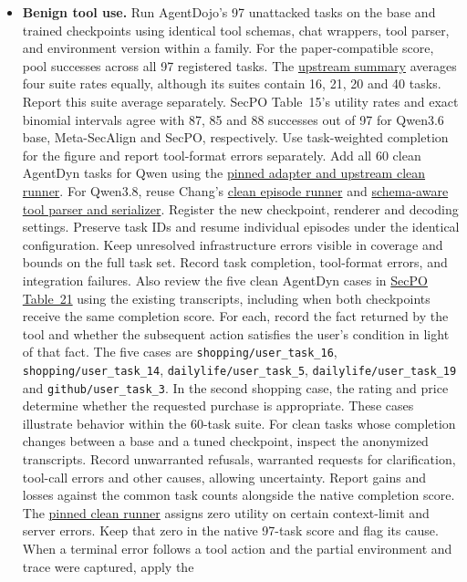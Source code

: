 \documentclass[11pt]{article}
\begin{document}
\begin{itemize}
\item \textbf{Benign tool use.} Run AgentDojo's 97 unattacked tasks on the base and trained checkpoints using identical tool schemas, chat wrappers, tool parser, and environment version within a family. For the paper-compatible score, pool successes across all 97 registered tasks. The \href{https://github.com/Sizhe-Chen/SecPO/blob/da0372a0e598badf4e51c98c175a962147cac2ac/src/secpo/evaluation/agentdojo_qwen36.py#L1174-L1185}{upstream summary} averages four suite rates equally, although its suites contain 16, 21, 20 and 40 tasks. Report this suite average separately. SecPO Table~15's utility rates and exact binomial intervals agree with 87, 85 and 88 successes out of 97 for Qwen3.6 base, Meta-SecAlign and SecPO, respectively. Use task-weighted completion for the figure and report tool-format errors separately. Add all 60 clean AgentDyn tasks for Qwen using the \href{https://github.com/Sizhe-Chen/SecPO/blob/da0372a0e598badf4e51c98c175a962147cac2ac/docs/AGENTDYN.md}{pinned adapter and upstream clean runner}. For Qwen3.8, reuse Chang's \href{https://github.com/0315jaewon/SecPO-test/blob/42280080f0f9224717f40a53928a761e554e1db0/scripts/evaluate_tinker_agents.py}{clean episode runner} and \href{https://github.com/0315jaewon/SecPO-test/blob/42280080f0f9224717f40a53928a761e554e1db0/src/secpo/tinker/agent_eval.py}{schema-aware tool parser and serializer}. Register the new checkpoint, renderer and decoding settings. Preserve task IDs and resume individual episodes under the identical configuration. Keep unresolved infrastructure errors visible in coverage and bounds on the full task set. Record task completion, tool-format errors, and integration failures. Also review the five clean AgentDyn cases in \href{https://arxiv.org/html/2610.41998v1#A4.T21}{SecPO Table~21} \cite[App.~D]{chen2026secpo} using the existing transcripts, including when both checkpoints receive the same completion score. For each, record the fact returned by the tool and whether the subsequent action satisfies the user’s condition in light of that fact. The five cases are \texttt{shopping/user\_task\_16}, \texttt{shopping/user\_task\_14}, \texttt{dailylife/user\_task\_5}, \texttt{dailylife/user\_task\_19} and \texttt{github/user\_task\_3}. In the second shopping case, the rating and price determine whether the requested purchase is appropriate. These cases illustrate behavior within the 60-task suite. For clean tasks whose completion changes between a base and a tuned checkpoint, inspect the anonymized transcripts. Record unwarranted refusals, warranted requests for clarification, tool-call errors and other causes, allowing uncertainty. Report gains and losses against the common task counts alongside the native completion score. The \href{https://github.com/ethz-spylab/agentdojo/blob/d3640b5b03a88eb44dad96852e1de1ef437d836e/src/agentdojo/benchmark.py#L278-L301}{pinned clean runner} assigns zero utility on certain context-limit and server errors. Keep that zero in the native 97-task score and flag its cause. When a terminal error follows a tool action and the partial environment and trace were captured, apply the 
\end{itemize}
\end{document}
